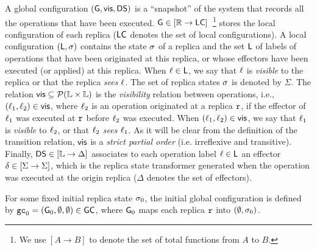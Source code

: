 A global configuration $(\mathsf{G}, \mathsf{vis}, \mathsf{DS})$ is a
``snapshot'' of the system that records all the operations that have
been executed.
$\mathsf{G} \in [\mathbb{R} \rightarrow \mathsf{LC}]$~\footnote{We use $[A\rightarrow B]$ to denote the set of total functions from
  $A$ to $B$.} stores the local
configuration of each replica ($\mathsf{LC}$ denotes the set of local configurations).
A local configuration $(\mathsf{L}, \sigma)$ contains the state
$\sigma$ of a replica and the set $\mathsf{L}$ of labels of
operations that have been originated at this replica, or whose
effectors have been executed (or applied) at this replica.
When $\ell\in \mathsf{L}$, we say that $\ell$ is \emph{visible}
to the replica or that the replica \emph{sees} $\ell$.
The set of replica states $\sigma$ is denoted by $\Sigma$.
The relation $\mathsf{vis}\subseteq \mathcal{P}(\mathbb{L} \times \mathbb{L})$ is
the \emph{visibility} relation between operations, i.e.,
$(\ell_1,\ell_2)\in \mathsf{vis}$, where $\ell_2$ is an operation
originated at a replica $\mathtt{r}$, if the effector of $\ell_1$ was
executed at $\mathtt{r}$ before $\ell_2$ was executed.
When $(\ell_1,\ell_2)\in \mathsf{vis}$, we say that $\ell_1$ is
\emph{visible} to $\ell_2$, or that $\ell_2$ \emph{sees}
$\ell_1$.
As it will be clear from the definition of the transition relation,
$\mathsf{vis}$ is a \emph{strict partial order} (i.e.
irreflexive and transitive).
Finally, $\mathsf{DS}\in [\mathbb{L} \rightarrow \Delta]$ associates to
each operation label $\ell \in \mathsf{L}$ an effector
$\delta\in [\Sigma \rightarrow \Sigma]$, which is the replica
state transformer generated when the operation was executed at the
origin replica ($\Delta$ denotes the set of effectors).

For some fixed initial replica state $\sigma_0$, the initial global configuration is defined by $\mathtt{gc}_0 = (\mathsf{G}_0, \emptyset, \emptyset) \in \mathsf{GC}$, where $\mathsf{G}_0$ maps each replica $\mathtt{r}$ into $(\emptyset, \sigma_0)$.


